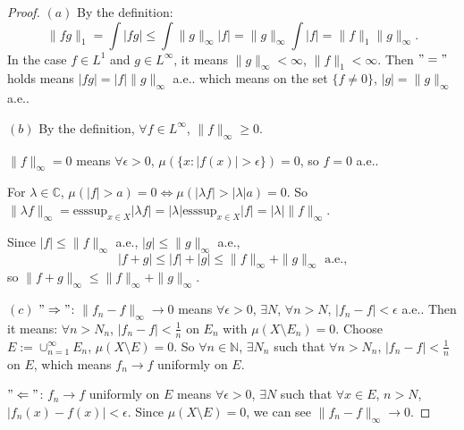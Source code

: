 \documentclass{article}
\newcommand{\norm}[1]{\|#1\|}
\newcommand{\cp}[2]{\cup_{#1=1}^{#2}}
\begin{document}
\begin{proof}
    $(a)$ By the definition:
    \begin{displaymath}
        \norm{fg}_1=\int|fg|\le\int \norm{g}_{\infty}|f|=\norm{g}_{\infty}\int|f|
        =\norm{f}_1\norm{g}_{\infty}.
    \end{displaymath}
    In the case $f\in L^{1}$ and $g\in L^{\infty}$, it means $\norm{g}_{\infty}<\infty$, 
    $\norm{f}_1<\infty$. Then $"="$ holds means $|fg|=|f|\norm{g}_{\infty}$ a.e.. 
    which means on the set $\{f\neq 0\}$, $|g|=\norm{g}_{\infty}$ a.e..

    $(b)$ By the definition, $\forall f\in L^{\infty}$, $\norm{f}_{\infty}\ge 0$. 

    $\norm{f}_{\infty}=0$ means $\forall\epsilon>0$, $\mu(\{x:|f(x)|>\epsilon\})=0$, 
    so $f=0$ a.e.. 

    For $\lambda\in\mathbb{C}$, $\mu(|f|>a)=0\Leftrightarrow \mu(|\lambda f|>|\lambda|a)=0$. 
    So $\norm{\lambda f}_{\infty}=\text{esssup}_{x\in X}|\lambda f|=|\lambda|\text{esssup}_{x\in X}|f|=|\lambda|\norm{f}_{\infty}$.

    Since $|f|\le\norm{f}_{\infty}$ a.e., $|g|\le\norm{g}_{\infty}$ a.e., 
    \begin{displaymath}
        |f+g|\le|f|+|g|\le\norm{f}_{\infty}+\norm{g}_{\infty}\text{ a.e.,}
    \end{displaymath}
    so $\norm{f+g}_{\infty}\le\norm{f}_{\infty}+\norm{g}_{\infty}$. 

    $(c)$ $"\Rightarrow"$: $\norm{f_n-f}_{\infty}\rightarrow 0$ means 
    $\forall\epsilon>0$, $\exists N$, $\forall n>N$, $|f_n-f|<\epsilon$ a.e.. 
    Then it means: $\forall n>N_{n}$, $|f_{n}-f|<\frac{1}{n}$ on $E_{n}$ 
    with $\mu(X\setminus E_{n})=0$. Choose $E:=\cp{n}{\infty}E_n$, 
    $\mu(X\setminus E)=0$. So $\forall n\in \mathbb{N}$, $\exists N_{n}$ such that 
    $\forall n>N_{n}$, $|f_{n}-f|<\frac{1}{n}$ on $E$, which means 
    $f_n\rightarrow f$ uniformly on $E$.

    $"\Leftarrow"$: $f_{n}\rightarrow f$ uniformly on $E$ means 
    $\forall\epsilon>0$, $\exists N$ such that $\forall x\in E$, $n>N$, 
    $|f_{n}(x)-f(x)|<\epsilon$. 
    Since $\mu(X\setminus E)=0$, we can see $\norm{f_n-f}_{\infty}\rightarrow 0$.


\end{proof}
\end{document}
